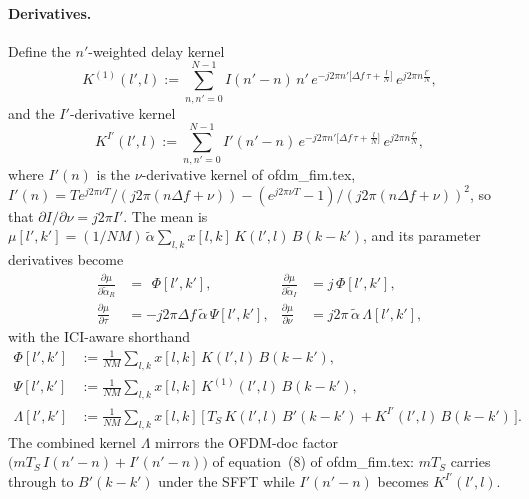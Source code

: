 \documentclass[11pt]{article}
\begin{document}
\paragraph{Derivatives.} Define the \(n'\)-weighted delay kernel
\begin{equation}
    K^{(1)}(l',l) := \sum_{n,n'=0}^{N-1} I(n'-n)\, n'\,
                     e^{-j2\pi n'\bigl[\Delta f\,\tau + \tfrac{l}{N}\bigr]}\,
                     e^{j2\pi n\tfrac{l'}{N}},
\end{equation}
and the \(I'\)-derivative kernel
\begin{equation}
    K^{I'}(l',l) := \sum_{n,n'=0}^{N-1} I'(n'-n)\,
                    e^{-j2\pi n'\bigl[\Delta f\,\tau + \tfrac{l}{N}\bigr]}\,
                    e^{j2\pi n\tfrac{l'}{N}},
\end{equation}
where \(I'(n)\) is the \(\nu\)-derivative kernel of ofdm\_fim.tex,
\(I'(n) = T e^{j2\pi\nu T}/(j2\pi(n\Delta f+\nu))
        - (e^{j2\pi\nu T}-1)/(j2\pi(n\Delta f+\nu))^2\), so that
\(\partial I/\partial\nu = j2\pi I'\). The mean is
\(\mu[l',k'] = (1/NM)\,\tilde{\alpha}\sum_{l,k} x[l,k]\, K(l',l)\, B(k-k')\),
and its parameter derivatives become
\begin{align}
    \frac{\partial \mu}{\partial \tilde{\alpha}_R} &= \phantom{j}\Phi[l',k'], &
    \frac{\partial \mu}{\partial \tilde{\alpha}_I} &= j\,\Phi[l',k'], \\
    \frac{\partial \mu}{\partial \tau} &= -j2\pi\Delta f\,\tilde{\alpha}\,\Psi[l',k'], &
    \frac{\partial \mu}{\partial \nu} &= j2\pi\,\tilde{\alpha}\,\Lambda[l',k'],
\end{align}
with the ICI-aware shorthand
\begin{align}
    \Phi[l',k']   &:= \tfrac{1}{NM}\sum_{l,k} x[l,k]\, K(l',l)\, B(k-k'), \\
    \Psi[l',k']   &:= \tfrac{1}{NM}\sum_{l,k} x[l,k]\, K^{(1)}(l',l)\, B(k-k'), \\
    \Lambda[l',k']&:= \tfrac{1}{NM}\sum_{l,k} x[l,k]\,
                      \bigl[\,T_S\, K(l',l)\, B'(k-k') + K^{I'}(l',l)\, B(k-k')\,\bigr].
\end{align}
The combined kernel \(\Lambda\) mirrors the OFDM-doc factor
\(\bigl(mT_S\, I(n'-n) + I'(n'-n)\bigr)\) of equation~(8) of
ofdm\_fim.tex: \(mT_S\) carries through to \(B'(k-k')\) under the SFFT
while \(I'(n'-n)\) becomes \(K^{I'}(l',l)\).
\end{document}
